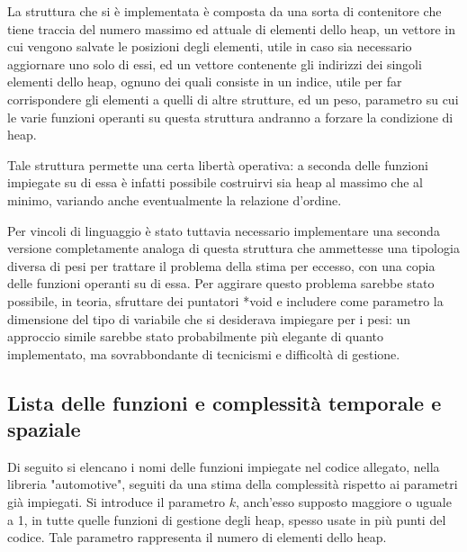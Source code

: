 \documentclass[a4paper,11pt]{Article}
\begin{document}
La struttura che si è implementata è composta da una sorta di contenitore che tiene traccia del numero massimo ed attuale di elementi dello heap, un vettore in cui vengono salvate le posizioni degli elementi, utile in caso sia necessario aggiornare uno solo di essi, ed un vettore contenente gli indirizzi dei singoli elementi dello heap, ognuno dei quali consiste in un indice, utile per far corrispondere gli elementi a quelli di altre strutture, ed un peso, parametro su cui le varie funzioni operanti su questa struttura andranno a forzare la condizione di heap.

Tale struttura permette una certa libertà operativa: a seconda delle funzioni impiegate su di essa è infatti possibile costruirvi sia heap al massimo che al minimo, variando anche eventualmente la relazione d'ordine.

Per vincoli di linguaggio è stato tuttavia necessario implementare una seconda versione completamente analoga di questa struttura che ammettesse una tipologia diversa di pesi per trattare il problema della stima per eccesso, con una copia delle funzioni operanti su di essa.
Per aggirare questo problema sarebbe stato possibile, in teoria, sfruttare dei puntatori *void e includere come parametro la dimensione del tipo di variabile che si desiderava impiegare per i pesi: un approccio simile sarebbe stato probabilmente più elegante di quanto implementato, ma sovrabbondante di tecnicismi e difficoltà di gestione.

\subsection{Lista delle funzioni e complessità temporale e spaziale}

Di seguito si elencano i nomi delle funzioni impiegate nel codice allegato, nella libreria "automotive", seguiti da una stima della complessità rispetto ai parametri già impiegati. Si introduce il parametro $k$, anch'esso supposto maggiore o uguale a 1, in tutte quelle funzioni di gestione degli heap, spesso usate in più punti del codice. Tale parametro rappresenta il numero di elementi dello heap.

\smallskip
\end{document}
